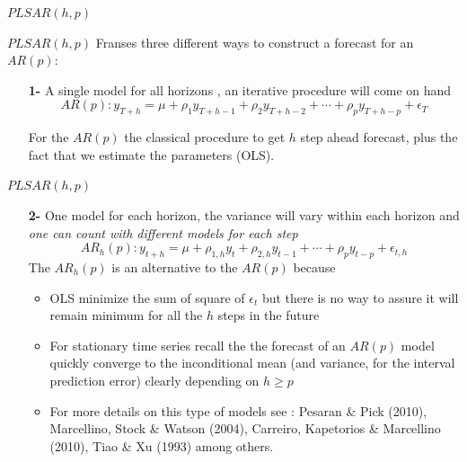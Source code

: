 \documentclass{beamer}
\newcommand{\?}{?`}
\begin{document}
\begin{frame}{}
  \begin{block}{}
    \begin{center}
      \vspace{3mm}
      {\Large $PLSAR(h,p)$}
      \vspace{3mm}
    \end{center}
  \end{block}
\end{frame}

\begin{frame}{$PLSAR(h,p)$}
  Franses three different ways to construct a forecast for an $AR(p)$:
  \bigskip
  \begin{itemize}
    \item[\textbf{1-}] A single model for all horizons , an iterative procedure will come on hand
      \begin{displaymath}
        AR(p): y_{T+h}=\mu+
        \rho_1y_{T+h-1}+\rho_2y_{T+h-2}+\cdots + \rho_py_{T+h-p} + \epsilon_T
      \end{displaymath}
      
      For the $AR(p)$ the classical procedure to get $h$
      step ahead forecast, plus the fact that we estimate the parameters (OLS).
  \end{itemize}
\end{frame}

\begin{frame}{$PLSAR(h,p)$}
  \begin{itemize}
  \item[\textbf{2-}] One model for each horizon, the variance will vary within each horizon and {\it{one can count with different models for each step}}
  \bigskip
    \begin{displaymath}
      AR_h(p): y_{t+h}=\mu+
      \rho_{1,h}y_{t}+\rho_{2,h}y_{t-1}+\cdots + \rho_py_{t-p}+\epsilon_{t,h}
    \end{displaymath}
    The $AR_h(p)$  is an alternative to the $AR(p)$ because
    \begin{itemize}
    \item OLS minimize the sum of square of $\epsilon_t$  but there is no way to assure it will remain minimum for all the $h$ steps in the future 
    \item For stationary time series recall the the forecast of an  $AR(p)$ model quickly converge to the inconditional mean (and variance, for the interval prediction error) clearly depending on  
    $h\geq p$
        \item For more details on this type of models see : Pesaran \& Pick (2010), Marcellino, Stock \& Watson (2004), Carreiro, Kapetorios \& Marcellino (2010), Tiao \& Xu (1993) among others.
    \end{itemize}
  \end{itemize}
\end{frame}
\end{document}
